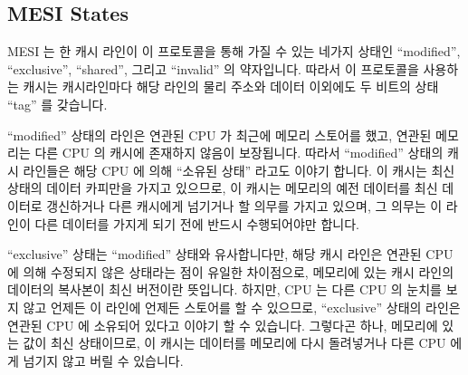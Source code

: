 \subsection{MESI States}
\label{sec:app:whymb:MESI States}

MESI 는 한 캐시 라인이 이 프로토콜을 통해 가질 수 있는 네가지 상태인
``modified'', ``exclusive'', ``shared'', 그리고 ``invalid'' 의 약자입니다.
따라서 이 프로토콜을 사용하는 캐시는 캐시라인마다 해당 라인의 물리 주소와
데이터 이외에도 두 비트의 상태 ``tag'' 를 갖습니다.

``modified'' 상태의 라인은 연관된 CPU 가 최근에 메모리 스토어를 했고, 연관된
메모리는 다른 CPU 의 캐시에 존재하지 않음이 보장됩니다.
따라서 ``modified'' 상태의 캐시 라인들은 해당 CPU 에 의해 ``소유된 상태''
라고도 이야기 합니다.
이 캐시는 최신 상태의 데이터 카피만을 가지고 있으므로, 이 캐시는 메모리의 예전
데이터를 최신 데이터로 갱신하거나 다른 캐시에게 넘기거나 할 의무를 가지고
있으며, 그 의무는 이 라인이 다른 데이터를 가지게 되기 전에 반드시 수행되어야만
합니다.

``exclusive'' 상태는 ``modified'' 상태와 유사합니다만, 해당 캐시 라인은 연관된
CPU 에 의해 수정되지 않은 상태라는 점이 유일한 차이점으로, 메모리에 있는 캐시
라인의 데이터의 복사본이 최신 버전이란 뜻입니다.
하지만, CPU 는 다른 CPU 의 눈치를 보지 않고 언제든 이 라인에 언제든 스토어를 할
수 있으므로, ``exclusive'' 상태의 라인은 연관된 CPU 에 소유되어 있다고 이야기
할 수 있습니다.
그렇다곤 하나, 메모리에 있는 값이 최신 상태이므로, 이 캐시는 데이터를 메모리에
다시 돌려넣거나 다른 CPU 에게 넘기지 않고 버릴 수 있습니다.

